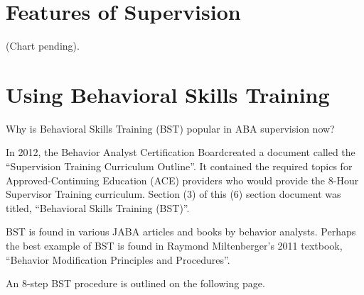 \section{Features of Supervision}
(Chart pending).
%
%
%
\section{Using Behavioral Skills Training}
%
Why is Behavioral Skills Training (BST) popular in ABA supervision now?

In 2012, the Behavior Analyst Certification Board\textregistered created a document called the ``Supervision Training Curriculum Outline''. It contained the required topics for Approved-Continuing Education (ACE) providers who would provide the 8-Hour Supervisor Training curriculum. Section (3) of this (6) section document was titled, ``Behavioral Skills Training (BST)''. 

BST is found in various JABA articles and books by behavior analysts. Perhaps the best example of BST is found in Raymond Miltenberger's 2011 textbook, ``Behavior Modification Principles and Procedures''. 

An 8-step BST procedure is outlined on the following page.
%
%
